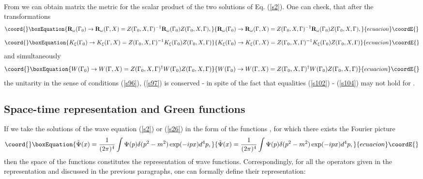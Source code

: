 \documentclass[a4paper,a4paper]{article}
\begin{document}
From \coordHE{} we can obtain matrix \coordHE{} the metric for the
scalar product of the two solutions of Eq. (\ref{s2}). One can check, that
after the transformations 
\begin{equation}\coord{}\boxEquation{
\mathbf{R}_{\omega }(\Gamma _{0})\rightarrow \mathbf{R}_{\omega }(\Gamma
,X)=Z(\Gamma _{0},X,\Gamma )^{-1}\mathbf{R}_{\omega }(\Gamma _{0})Z(\Gamma
_{0},X,\Gamma ),  \label{s106}
}{
\mathbf{R}_{\omega }(\Gamma _{0})\rightarrow \mathbf{R}_{\omega }(\Gamma
,X)=Z(\Gamma _{0},X,\Gamma )^{-1}\mathbf{R}_{\omega }(\Gamma _{0})Z(\Gamma
_{0},X,\Gamma ),  }{ecuacion}\coordE{}\end{equation}%
\begin{equation}\coord{}\boxEquation{
K_{\xi }(\Gamma _{0})\rightarrow K_{\xi }(\Gamma ,X)=Z(\Gamma _{0},X,\Gamma
)^{-1}K_{\xi }(\Gamma _{0})Z(\Gamma _{0},X,\Gamma )  \label{s107}
}{
K_{\xi }(\Gamma _{0})\rightarrow K_{\xi }(\Gamma ,X)=Z(\Gamma _{0},X,\Gamma
)^{-1}K_{\xi }(\Gamma _{0})Z(\Gamma _{0},X,\Gamma )  }{ecuacion}\coordE{}\end{equation}%
and simultaneously 
\begin{equation}\coord{}\boxEquation{
W(\Gamma _{0})\rightarrow W(\Gamma ,X)=Z(\Gamma _{0},X,\Gamma )^{\dagger
}W(\Gamma _{0})Z(\Gamma _{0},X,\Gamma )  \label{s108}
}{
W(\Gamma _{0})\rightarrow W(\Gamma ,X)=Z(\Gamma _{0},X,\Gamma )^{\dagger
}W(\Gamma _{0})Z(\Gamma _{0},X,\Gamma )  }{ecuacion}\coordE{}\end{equation}%
the unitarity in the sense of conditions (\ref{s96}), (\ref{s97}) is
conserved - in spite of the fact that equalities (\ref{s102}) - (\ref{s104})
may not hold for \coordHE{}.

\subsection{Space-time representation and Green functions}

If we take the solutions of the wave equation (\ref{s2}) or (\ref{s26}) in
the form of the functions \coordHE{}, for which there exists the Fourier
picture 
\begin{equation}\coord{}\boxEquation{
\tilde{\Psi}(x)=\frac{1}{(2\pi )^{4}}\int \Psi (p)\delta (p^{2}-m^{2})\exp
(-ipx)d^{4}p,  \label{s109}
}{
\tilde{\Psi}(x)=\frac{1}{(2\pi )^{4}}\int \Psi (p)\delta (p^{2}-m^{2})\exp
(-ipx)d^{4}p,  }{ecuacion}\coordE{}\end{equation}%
then the space of the functions \coordHE{} constitutes the \coordHE{}
representation of wave functions. Correspondingly, for all the operators \coordHE{} given in the \coordHE{} representation and discussed in the previous
paragraphs, one can formally define their \coordHE{} representation:
\end{document}

